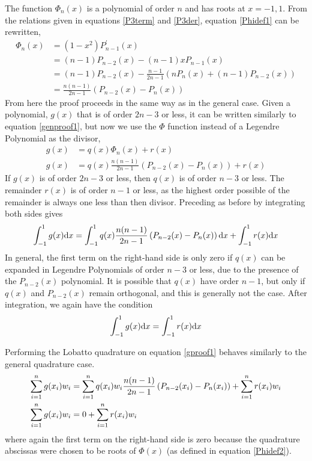 The function $\Phi_n(x)$ is a polynomial of order $n$ and has roots at $x=-1,1$. 
From the relations given in equations \ref{P3term} and \ref{P3der}, equation \ref{Phidef1}
can be rewritten, 
\begin{align}
\label{Phidef2}
\Phi_n(x)&=(1-x^2)P_{n-1}^\prime(x) \nonumber \\
&=(n-1)P_{n-2}(x)-(n-1)xP_{n-1}(x) \nonumber \\
&=(n-1)P_{n-2}(x)-\frac{n-1}{2n-1}\left(nP_n(x)+(n-1)P_{n-2}(x)\right) \nonumber \\
&=\frac{n(n-1)}{2n-1}\left(P_{n-2}(x)-P_n(x)\right)
\end{align}
From here the proof proceeds in the same way as in the general case. 
Given a polynomial, $g(x)$ that is of order $2n-3$ or less, it can be written 
similarly to equation \ref{genproof1}, but now we use the $\Phi$ function instead of 
a Legendre Polynomial as the divisor, 
\begin{align}
\label{gproof1}
g(x)&=q(x)\Phi_n(x)+r(x) \nonumber \\
g(x)&=q(x)\frac{n(n-1)}{2n-1}\left(P_{n-2}(x)-P_n(x)\right) +r(x) 
\end{align}
If $g(x)$ is of order $2n-3$ or less, then $q(x)$ is of order $n-3$ or less. The remainder
$r(x)$ is of order $n-1$ or less, as the highest order possible of the remainder is always one
less than then divisor. Preceding as before by integrating both sides gives
\begin{equation}
\label{gproof2}
\int_{-1}^{1} g(x){\rm d}x = \int_{-1}^{1} q(x)\frac{n(n-1)}{2n-1}\left(P_{n-2}(x)-P_n(x)\right){\rm d}x + \int_{-1}^{1} r(x){\rm d}x 
\end{equation}
In general, the first term on the right-hand side is only zero if $q(x)$ can be 
expanded in Legendre Polynomials of order $n-3$ or less, due to the presence of the
$P_{n-2}(x)$ polynomial. It is possible that $q(x)$ have order $n-1$, but only if 
$q(x)$ and $P_{n-2}(x)$ remain orthogonal, and this is generally not the case. 
After integration, we again have the condition
\begin{equation}
\label{gproof3}
\int_{-1}^{1} g(x){\rm d}x = \int_{-1}^{1} r(x){\rm d}x 
\end{equation}

Performing the Lobatto quadrature on equation \ref{gproof1} behaves similarly to the
general quadrature case. 
\begin{align}
\label{gproof4}
\sum_{i=1}^{n} g(x_i)w_i &= \sum_{i=1}^{n} q(x_i)w_i\frac{n(n-1)}{2n-1}\left(P_{n-2}(x_i)-P_n(x_i)\right) + \sum_{i=1}^{n} r(x_i)w_i \nonumber \\
\sum_{i=1}^{n} g(x_i)w_i &= 0 + \sum_{i=1}^{n} r(x_i)w_i
\end{align}
where again the first term on the right-hand side is zero because the quadrature
abscissas were chosen to be roots of $\Phi(x)$ (as defined in equation \ref{Phidef2}). 

